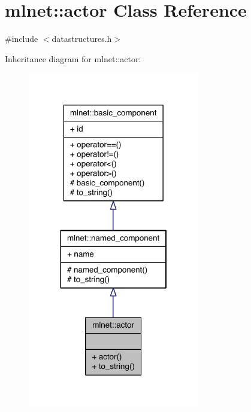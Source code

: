 \hypertarget{classmlnet_1_1actor}{\section{mlnet\+:\+:actor Class Reference}
\label{classmlnet_1_1actor}
}


{\ttfamily \#include $<$datastructures.\+h$>$}



Inheritance diagram for mlnet\+:\+:actor\+:\nopagebreak
\begin{figure}[H]
\begin{center}
\leavevmode
\includegraphics[width=212pt]{classmlnet_1_1actor__inherit__graph}
\end{center}
\end{figure}


